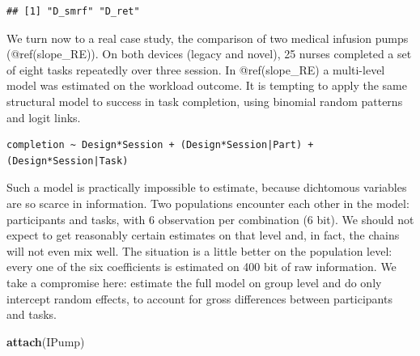 \documentclass[]{svmono}
\newenvironment{Shaded}{\begin{snugshade}}{\end{snugshade}}
\newcommand{\KeywordTok}[1]{\textcolor[rgb]{0.13,0.29,0.53}{\textbf{#1}}}
\newcommand{\DataTypeTok}[1]{\textcolor[rgb]{0.13,0.29,0.53}{#1}}
\newcommand{\DecValTok}[1]{\textcolor[rgb]{0.00,0.00,0.81}{#1}}
\newcommand{\StringTok}[1]{\textcolor[rgb]{0.31,0.60,0.02}{#1}}
\newcommand{\OperatorTok}[1]{\textcolor[rgb]{0.81,0.36,0.00}{\textbf{#1}}}
\newcommand{\NormalTok}[1]{#1}
\theoremstyle{definition}
\theoremstyle{definition}
\theoremstyle{definition}
\theoremstyle{remark}
\begin{document}
\begin{verbatim}
## [1] "D_smrf" "D_ret"
\end{verbatim}

We turn now to a real case study, the comparison of two medical infusion
pumps (@ref(slope\_RE)). On both devices (legacy and novel), 25 nurses
completed a set of eight tasks repeatedly over three session. In
@ref(slope\_RE) a multi-level model was estimated on the workload
outcome. It is tempting to apply the same structural model to success in
task completion, using binomial random patterns and logit links.

\begin{verbatim}
completion ~ Design*Session + (Design*Session|Part) + (Design*Session|Task)
\end{verbatim}

Such a model is practically impossible to estimate, because dichtomous
variables are so scarce in information. Two populations encounter each
other in the model: participants and tasks, with 6 observation per
combination (6 bit). We should not expect to get reasonably certain
estimates on that level and, in fact, the chains will not even mix well.
The situation is a little better on the population level: every one of
the six coefficients is estimated on 400 bit of raw information. We take
a compromise here: estimate the full model on group level and do only
intercept random effects, to account for gross differences between
participants and tasks.

\begin{Shaded}
\begin{Highlighting}[]
\KeywordTok{attach}\NormalTok{(IPump)}
\end{Highlighting}
\end{Shaded}

\begin{Shaded}
\end{Shaded}
\end{document}
